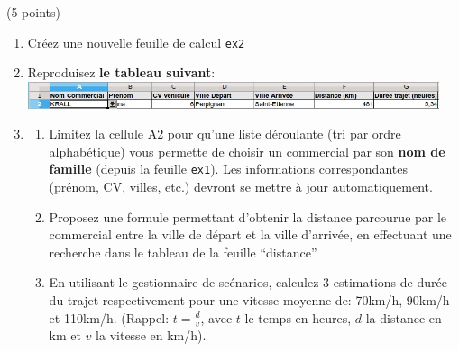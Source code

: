 \documentclass[a4paper]{article}
\begin{document}
\exost (5 points)
%
\begin{enumerate}
 \item Cr\'eez une nouvelle feuille de calcul \verb?ex2?
 \item  Reproduisez \textbf{le tableau suivant}: \\ \includegraphics[width=0.95\textwidth]{feuille.png}
 \item \begin{enumerate}
        \item Limitez la cellule A2 pour qu'une liste d\'eroulante (tri par ordre alphab\'etique) vous permette de choisir un commercial par son \textbf{nom de famille}
        (depuis la feuille \verb?ex1?). 
        Les informations correspondantes (pr\'enom, CV, villes, etc.) devront se mettre \`a jour automatiquement.  %
        \item Proposez une formule permettant d'obtenir la distance parcourue par le commercial entre la ville de d\'epart et la ville d'arriv\'ee,
        en effectuant une recherche dans le tableau de la feuille ``distance''.   %
	\item En utilisant le gestionnaire de sc\'enarios, calculez 3 estimations de dur\'ee du trajet respectivement pour une vitesse moyenne de: 70km/h, 90km/h et 110km/h. 
	(Rappel: $t = \frac{d}{v}$, avec $t$ le temps en heures, $d$ la distance en km et $v$ la vitesse en km/h). %
       \end{enumerate}
\end{enumerate}
\end{document}
